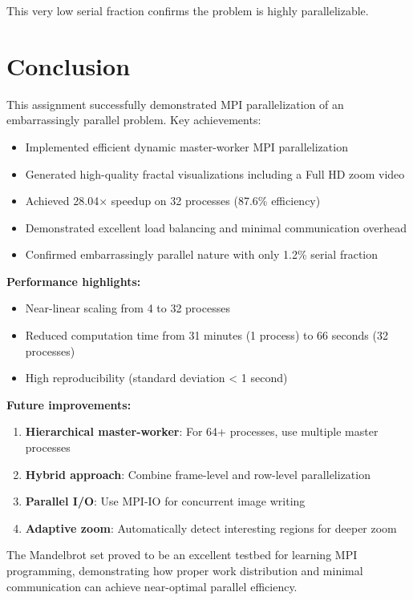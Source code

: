 \documentclass[11pt,a4paper]{article}
\begin{document}
	This very low serial fraction confirms the problem is highly parallelizable.
	
	\section{Conclusion}
	
	This assignment successfully demonstrated MPI parallelization of an embarrassingly parallel problem. Key achievements:
	\begin{itemize}
		\item Implemented efficient dynamic master-worker MPI parallelization
		\item Generated high-quality fractal visualizations including a Full HD zoom video
		\item Achieved 28.04× speedup on 32 processes (87.6\% efficiency)
		\item Demonstrated excellent load balancing and minimal communication overhead
		\item Confirmed embarrassingly parallel nature with only 1.2\% serial fraction
	\end{itemize}
	
	\textbf{Performance highlights:}
	\begin{itemize}
		\item Near-linear scaling from 4 to 32 processes
		\item Reduced computation time from 31 minutes (1 process) to 66 seconds (32 processes)
		\item High reproducibility (standard deviation < 1 second)
	\end{itemize}
	
	\textbf{Future improvements:}
	\begin{enumerate}
		\item \textbf{Hierarchical master-worker}: For 64+ processes, use multiple master processes
		\item \textbf{Hybrid approach}: Combine frame-level and row-level parallelization
		\item \textbf{Parallel I/O}: Use MPI-IO for concurrent image writing
		\item \textbf{Adaptive zoom}: Automatically detect interesting regions for deeper zoom
	\end{enumerate}
	
	The Mandelbrot set proved to be an excellent testbed for learning MPI programming, demonstrating how proper work distribution and minimal communication can achieve near-optimal parallel efficiency.
	
\end{document}
